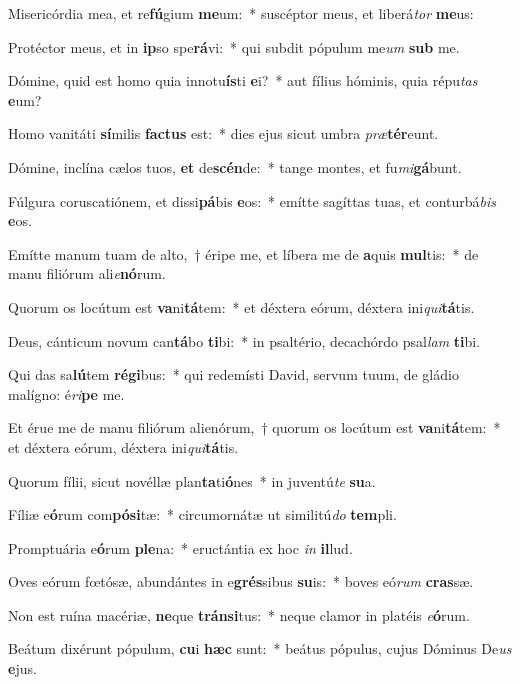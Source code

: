 \item Misericórdia mea, et re\textbf{fú}gium \textbf{me}um:~* suscéptor meus, et liberá\textit{tor} \textbf{me}us:
\item Protéctor meus, et in \textbf{ip}so spe\textbf{rá}vi:~* qui subdit pópulum me\textit{um} \textbf{sub} me.
\item Dómine, quid est homo quia innotu\textbf{ís}ti \textbf{e}i?~* aut fílius hóminis, quia répu\textit{tas} \textbf{e}um?
\item Homo vanitáti \textbf{sí}milis \textbf{fac}\textbf{tus} est:~* dies ejus sicut umbra \textit{præ}\textbf{tér}eunt.
\item Dómine, inclína cælos tuos, \textbf{et} de\textbf{scén}de:~* tange montes, et fu\textit{mi}\textbf{gá}bunt.
\item Fúlgura coruscatiónem, et dissi\textbf{pá}bis \textbf{e}os:~* emítte sagíttas tuas, et conturbá\textit{bis} \textbf{e}os.
\item Emítte manum tuam de alto,~† éripe me, et líbera me de \textbf{a}quis \textbf{mul}tis:~* de manu filiórum ali\textit{e}\textbf{nó}rum.
\item Quorum os locútum est \textbf{va}ni\textbf{tá}tem:~* et déxtera eórum, déxtera ini\textit{qui}\textbf{tá}tis.
\item Deus, cánticum novum can\textbf{tá}bo \textbf{ti}bi:~* in psaltério, decachórdo psal\textit{lam} \textbf{ti}bi.
\item Qui das sa\textbf{lú}tem \textbf{ré}\textbf{gi}bus:~* qui redemísti David, servum tuum, de gládio malígno: é\textit{ri}\textbf{pe} me.
\item Et érue me de manu filiórum alienórum,~† quorum os locútum est \textbf{va}ni\textbf{tá}tem:~* et déxtera eórum, déxtera ini\textit{qui}\textbf{tá}tis.
\item Quorum fílii, sicut novéllæ plan\textbf{ta}ti\textbf{ó}nes~* in juventú\textit{te} \textbf{su}a.
\item Fíliæ e\textbf{ó}rum com\textbf{pó}\textbf{si}tæ:~* circumornátæ ut similitú\textit{do} \textbf{tem}pli.
\item Promptuária e\textbf{ó}rum \textbf{ple}na:~* eructántia ex hoc \textit{in} \textbf{il}lud.
\item Oves eórum fœtósæ, abundántes in e\textbf{grés}sibus \textbf{su}is:~* boves eó\textit{rum} \textbf{cras}sæ.
\item Non est ruína macériæ, \textbf{ne}que \textbf{tráns}\textbf{i}tus:~* neque clamor in platéis \textit{e}\textbf{ó}rum.
\item Beátum dixérunt pópulum, \textbf{cu}i \textbf{hæc} sunt:~* beátus pópulus, cujus Dóminus De\textit{us} \textbf{e}jus.
